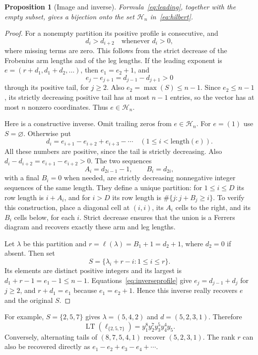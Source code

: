 \documentclass[11pt]{article}
\newtheorem{proposition}[theorem]{Proposition}
\theoremstyle{definition}
\theoremstyle{remark}
\newcommand{\LT}{\operatorname{LT}}
\begin{document}
\begin{proposition}[Image and inverse]\label{prop:bijection}
Formula~\eqref{eq:leading}, together with the empty subset, gives a bijection
onto the set $\mathcal H_n$ in~\eqref{eq:hilbert}.
\end{proposition}
\begin{proof}
For a nonempty partition its positive profile is consecutive, and
\[
 d_i>d_{i+2}\quad\text{whenever }d_i>0,
\]
where missing terms are zero. This follows from the strict decrease of the
Frobenius arm lengths and of the leg lengths. If the leading exponent is
$e=(r+d_1,d_1+d_2,\ldots)$, then $e_1=e_2+1$, and
\[
 e_j-e_{j+1}=d_{j-1}-d_{j+1}>0
\]
through its positive tail, for $j\ge2$. Also $e_2=\max(S)\le n-1$.
Since $e_2\le n-1$, its strictly decreasing positive tail has at most
$n-1$ entries, so the vector has at most $n$ nonzero coordinates.
Thus $e\in\mathcal H_n$.

Here is a constructive inverse. Omit trailing zeros from $e\in\mathcal H_n$.
For $e=(1)$ use $S=\varnothing$. Otherwise put
\begin{equation}\label{eq:inverseprofile}
 d_i=e_{i+1}-e_{i+2}+e_{i+3}-\cdots\quad(1\le i<\text{length}(e)).
\end{equation}
All these numbers are positive, since the tail is strictly decreasing.
Also $d_i-d_{i+2}=e_{i+1}-e_{i+2}>0$.
The two sequences
\[
 A_i=d_{2i-1}-1,\qquad B_i=d_{2i},
\]
with a final $B_i=0$ when needed, are strictly decreasing nonnegative
integer sequences of the same length. They define a unique partition:
for $1\le i\le D$ its row length is $i+A_i$, and for $i>D$ its row
length is $\#\{j:j+B_j\ge i\}$.
To verify this construction, place a diagonal cell at $(i,i)$, its $A_i$
cells to the right, and its $B_i$ cells below, for each $i$. Strict decrease
ensures that the union is a Ferrers diagram and recovers exactly these arm
and leg lengths.

Let $\lambda$ be this partition and $r=\ell(\lambda)=B_1+1=d_2+1$,
where $d_2=0$ if absent. Then set
\begin{equation}\label{eq:inverseS}
 S=\{\lambda_i+r-i:1\le i\le r\}.
\end{equation}
Its elements are distinct positive integers and its largest is
$d_1+r-1=e_1-1\le n-1$. Equations~\eqref{eq:inverseprofile} give
$e_j=d_{j-1}+d_j$ for $j\ge2$, and $r+d_1=e_1$ because
$e_1=e_2+1$. Hence this inverse really recovers $e$ and the original $S$.
\end{proof}

For example, $S=\{2,5,7\}$ gives $\lambda=(5,4,2)$ and
$d=(5,2,3,1)$. Therefore
\[
 \LT(\ell_{\{2,5,7\}})=y_1^8y_2^7y_3^5y_4^4y_5.
\]
Conversely, alternating tails of $(8,7,5,4,1)$ recover $(5,2,3,1)$.
The rank $r$ can also be recovered directly as $e_1-e_2+e_3-e_4+\cdots$.
\end{document}
